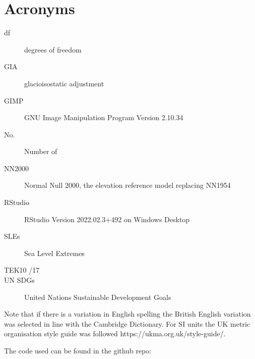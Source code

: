 
\chapter{Acronyms}
\begin{description}
\item[df]degrees of freedom
\item[GIA] glacioisostatic adjustment
\item[GIMP] GNU Image Manipulation Program Version 2.10.34
\item[No.] Number of
\item[NN2000] Normal Null 2000, the elevation reference model replacing NN1954
\item [RStudio] RStudio Version 2022.02.3+492 on Windows Desktop
\item[SLEs] Sea Level Extremes
\item[TEK10 /17]
\item [UN SDGs] United Nations Sustainable Development Goals 
\end{description}

Note that if there is a variation in English spelling the British English variation was selected in line with the Cambridge Dictionary. For SI units the UK metric organisation style guide was followed https://ukma.org.uk/style-guide/.  

The code used can be found in the github repo: 